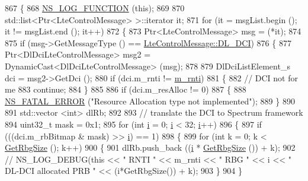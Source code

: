 \begin{DoxyCode}
867 \{
868   \hyperlink{log-macros-disabled_8h_a90b90d5bad1f39cb1b64923ea94c0761}{NS\_LOG\_FUNCTION} (\textcolor{keyword}{this});
869 
870   std::list<Ptr<LteControlMessage> >::iterator it;
871   \textcolor{keywordflow}{for} (it = msgList.begin (); it != msgList.end (); it++)
872     \{
873       Ptr<LteControlMessage> msg = (*it);
874 
875       \textcolor{keywordflow}{if} (msg->GetMessageType () == \hyperlink{classns3_1_1LteControlMessage_a9f9798d5aa8ad40f6432285b4b06135ba9cd550d54eff16dc9f72579d925d72ff}{LteControlMessage::DL\_DCI})
876         \{
877           Ptr<DlDciLteControlMessage> msg2 = DynamicCast<DlDciLteControlMessage> (msg);
878 
879           DlDciListElement\_s dci = msg2->GetDci ();
880           \textcolor{keywordflow}{if} (dci.m\_rnti != \hyperlink{classns3_1_1LteUePhy_a887b5dc4e246a308cd09127b64ed8fac}{m\_rnti})
881             \{
882               \textcolor{comment}{// DCI not for me}
883               \textcolor{keywordflow}{continue};
884             \}
885 
886           \textcolor{keywordflow}{if} (dci.m\_resAlloc != 0)
887             \{
888               \hyperlink{group__fatal_ga5131d5e3f75d7d4cbfd706ac456fdc85}{NS\_FATAL\_ERROR} (\textcolor{stringliteral}{"Resource Allocation type not implemented"});
889             \}
890 
891           std::vector <int> dlRb;
892 
893           \textcolor{comment}{// translate the DCI to Spectrum framework}
894           uint32\_t mask = 0x1;
895           \textcolor{keywordflow}{for} (\textcolor{keywordtype}{int} \hyperlink{bernuolliDistribution_8m_a6f6ccfcf58b31cb6412107d9d5281426}{i} = 0; \hyperlink{bernuolliDistribution_8m_a6f6ccfcf58b31cb6412107d9d5281426}{i} < 32; \hyperlink{bernuolliDistribution_8m_a6f6ccfcf58b31cb6412107d9d5281426}{i}++)
896             \{
897               \textcolor{keywordflow}{if} (((dci.m\_rbBitmap & mask) >> \hyperlink{bernuolliDistribution_8m_a6f6ccfcf58b31cb6412107d9d5281426}{i}) == 1)
898                 \{
899                   \textcolor{keywordflow}{for} (\textcolor{keywordtype}{int} k = 0; k < \hyperlink{classns3_1_1LtePhy_a0b43cc13670b730fce0b55c8e0db60d9}{GetRbgSize} (); k++)
900                     \{
901                       dlRb.push\_back ((\hyperlink{bernuolliDistribution_8m_a6f6ccfcf58b31cb6412107d9d5281426}{i} * \hyperlink{classns3_1_1LtePhy_a0b43cc13670b730fce0b55c8e0db60d9}{GetRbgSize} ()) + k);
902 \textcolor{comment}{//             NS\_LOG\_DEBUG(this << " RNTI " << m\_rnti << " RBG " << i << " DL-DCI allocated PRB " <<
       (i*GetRbgSize()) + k);}
903                     \}
904                 \}

\end{DoxyCode}
